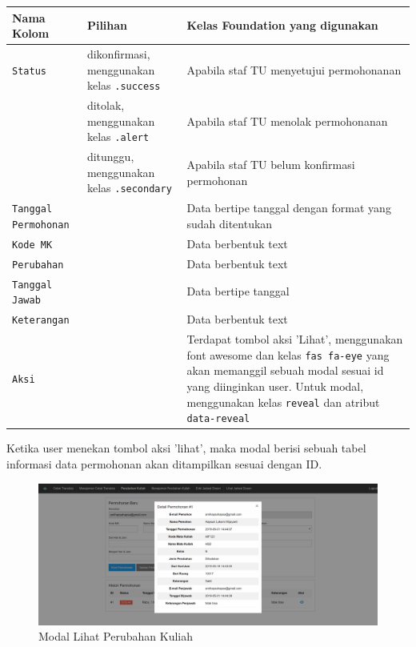 \documentclass[a4paper,twoside]{article}
\begin{document}
\begin{enumerate}
		\begin{tabular}[!htbp]{ |p{4cm}|p{2cm}|p{10cm}|  }
			\hline
			Nama Kolom & Pilihan & Kelas Foundation yang digunakan\\
			\hline
			\texttt{Status} & dikonfirmasi, menggunakan kelas \colorbox{mygray}{\texttt{.success}} & Apabila staf TU menyetujui permohonanan\\
			\hline
			&  ditolak, menggunakan kelas \colorbox{mygray}{\texttt{.alert}}  & Apabila staf TU menolak permohonanan\\
			\hline
			& ditunggu, menggunakan kelas \colorbox{mygray}{\texttt{.secondary}} &  Apabila staf TU belum konfirmasi permohonan \\
			\hline
			\texttt{Tanggal Permohonan}    & & Data bertipe tanggal dengan format yang sudah ditentukan\\
			\hline
			\texttt{Kode MK} &  & Data berbentuk text \\
			\hline
			\texttt{Perubahan} &  & Data berbentuk text \\
			\hline
			\texttt{Tanggal Jawab} &  & Data bertipe tanggal \\
			\hline
			\texttt{Keterangan} &  & Data berbentuk text \\
			\hline
			\texttt{Aksi} &  & Terdapat tombol aksi 'Lihat', menggunakan font awesome dan kelas \colorbox{mygray}{\texttt{fas fa-eye}} yang akan memanggil sebuah modal sesuai id yang diinginkan user. Untuk modal, menggunakan kelas \texttt{reveal} dan atribut \colorbox{mygray}{\texttt{data-reveal}}\\
			\hline
		\end{tabular}
		Ketika user menekan tombol aksi 'lihat', maka modal berisi sebuah tabel informasi data permohonan akan ditampilkan sesuai dengan ID.
		\begin{figure} [H]
			\centering  
			\includegraphics[scale=0.5]{Modal-Lihat-Perubahan-Kuliah.png}  
			\caption{Modal Lihat Perubahan Kuliah} 
		\end{figure}
		

\end{enumerate}
\end{document}
